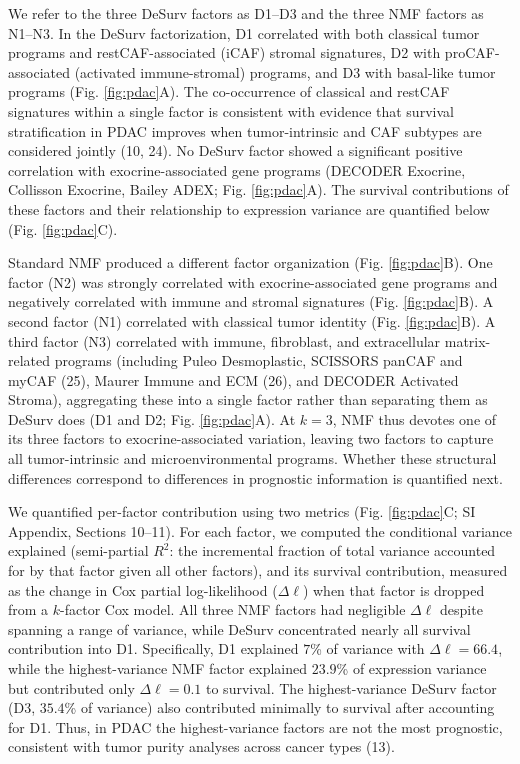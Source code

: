 \documentclass[9pt,twocolumn,twoside,]{pnas-new}
\begin{document}
We refer to the three DeSurv factors as D1--D3 and the three NMF factors
as N1--N3. In the DeSurv factorization, D1 correlated with both
classical tumor programs and restCAF-associated (iCAF) stromal
signatures, D2 with proCAF-associated (activated immune-stromal)
programs, and D3 with basal-like tumor programs (Fig. \ref{fig:pdac}A).
The co-occurrence of classical and restCAF signatures within a single
factor is consistent with evidence that survival stratification in PDAC
improves when tumor-intrinsic and CAF subtypes are considered jointly
(10, 24). No DeSurv factor showed a significant positive correlation
with exocrine-associated gene programs (DECODER Exocrine, Collisson
Exocrine, Bailey ADEX; Fig. \ref{fig:pdac}A). The survival contributions
of these factors and their relationship to expression variance are
quantified below (Fig. \ref{fig:pdac}C).

Standard NMF produced a different factor organization (Fig.
\ref{fig:pdac}B). One factor (N2) was strongly correlated with
exocrine-associated gene programs and negatively correlated with immune
and stromal signatures (Fig. \ref{fig:pdac}B). A second factor (N1)
correlated with classical tumor identity (Fig. \ref{fig:pdac}B). A third
factor (N3) correlated with immune, fibroblast, and extracellular
matrix-related programs (including Puleo Desmoplastic, SCISSORS panCAF
and myCAF (25), Maurer Immune and ECM (26), and DECODER Activated
Stroma), aggregating these into a single factor rather than separating
them as DeSurv does (D1 and D2; Fig. \ref{fig:pdac}A). At \(k = 3\), NMF
thus devotes one of its three factors to exocrine-associated variation,
leaving two factors to capture all tumor-intrinsic and
microenvironmental programs. Whether these structural differences
correspond to differences in prognostic information is quantified next.

We quantified per-factor contribution using two metrics (Fig.
\ref{fig:pdac}C; SI Appendix, Sections 10--11). For each factor, we
computed the conditional variance explained (semi-partial \(R^2\): the
incremental fraction of total variance accounted for by that factor
given all other factors), and its survival contribution, measured as the
change in Cox partial log-likelihood (\(\Delta\ell\)) when that factor
is dropped from a \(k\)-factor Cox model. All three NMF factors had
negligible \(\Delta\ell\) despite spanning a range of variance, while
DeSurv concentrated nearly all survival contribution into D1.
Specifically, D1 explained \(7\)\% of variance with
\(\Delta\ell = 66.4\), while the highest-variance NMF factor explained
\(23.9\)\% of expression variance but contributed only
\(\Delta\ell = 0.1\) to survival. The highest-variance DeSurv factor
(D3, \(35.4\)\% of variance) also contributed minimally to survival
after accounting for D1. Thus, in PDAC the highest-variance factors are
not the most prognostic, consistent with tumor purity analyses across
cancer types (13).
\end{document}
